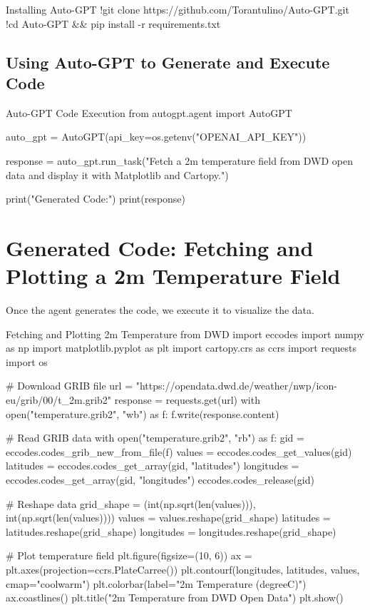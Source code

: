 \begin{codeonly}{Installing Auto-GPT}
!git clone https://github.com/Torantulino/Auto-GPT.git
!cd Auto-GPT && pip install -r requirements.txt
\end{codeonly}

\subsection{Using Auto-GPT to Generate and Execute Code}

\begin{codeonly}{Auto-GPT Code Execution}
from autogpt.agent import AutoGPT

auto_gpt = AutoGPT(api_key=os.getenv("OPENAI_API_KEY"))

response = auto_gpt.run_task("Fetch a 2m temperature field from DWD open data and display it with Matplotlib and Cartopy.")

print("Generated Code:")
print(response)
\end{codeonly}

\section{Generated Code: Fetching and Plotting a 2m Temperature Field}
Once the agent generates the code, we execute it to visualize the data.

\begin{codeonly}{Fetching and Plotting 2m Temperature from DWD}
import eccodes
import numpy as np
import matplotlib.pyplot as plt
import cartopy.crs as ccrs
import requests
import os

# Download GRIB file
url = "https://opendata.dwd.de/weather/nwp/icon-eu/grib/00/t_2m.grib2"
response = requests.get(url)
with open("temperature.grib2", "wb") as f:
    f.write(response.content)

# Read GRIB data
with open("temperature.grib2", "rb") as f:
    gid = eccodes.codes_grib_new_from_file(f)
    values = eccodes.codes_get_values(gid)
    latitudes = eccodes.codes_get_array(gid, "latitudes")
    longitudes = eccodes.codes_get_array(gid, "longitudes")
    eccodes.codes_release(gid)

# Reshape data
grid_shape = (int(np.sqrt(len(values))), int(np.sqrt(len(values))))
values = values.reshape(grid_shape)
latitudes = latitudes.reshape(grid_shape)
longitudes = longitudes.reshape(grid_shape)

# Plot temperature field
plt.figure(figsize=(10, 6))
ax = plt.axes(projection=ccrs.PlateCarree())
plt.contourf(longitudes, latitudes, values, cmap="coolwarm")
plt.colorbar(label="2m Temperature (degreeC)")
ax.coastlines()
plt.title("2m Temperature from DWD Open Data")
plt.show()
\end{codeonly}

